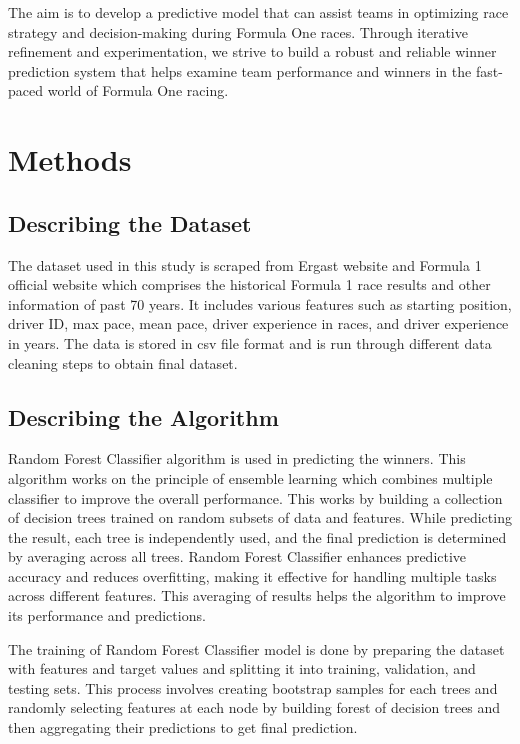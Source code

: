 \documentclass[11pt,article,oneside]{article}
\begin{document}
The aim is to develop a predictive model that can assist teams in optimizing race strategy and decision-making during Formula One races. Through iterative refinement and experimentation, we strive to build a robust and reliable winner prediction system that helps examine team performance and winners in the fast-paced world of Formula One racing.
\clearpage

\section{Methods}
\subsection{Describing the Dataset}
The dataset used in this study is scraped from Ergast website \citep{ref3} and Formula 1 official website which comprises the historical Formula 1 race results and other information of past 70 years. It includes various features such as starting position, driver ID, max pace, mean pace, driver experience in races, and driver experience in years. The data is stored in csv file format and is run through different data cleaning steps to obtain final dataset. 

\subsection{Describing the Algorithm}
Random Forest Classifier algorithm is used in predicting the winners. This algorithm works on the principle of ensemble learning  which combines multiple classifier to improve the overall performance. This works by building a collection of decision trees trained on random subsets of data and features\citep{ref4}. While predicting the result, each tree is independently used, and the final prediction is determined by averaging across all trees. 
Random Forest Classifier enhances predictive accuracy and reduces overfitting, making it effective for handling multiple tasks across different features. This averaging of results helps the algorithm to improve its performance and predictions.

The training of Random Forest Classifier model is done by preparing the dataset with features and target values and splitting it into training, validation, and testing sets. This process involves creating bootstrap samples for each trees and randomly selecting features at each node by building forest of decision trees and then aggregating their predictions to get final prediction.
 
\end{document}

